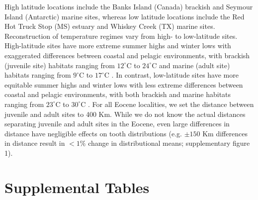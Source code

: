 \documentclass[]{rsos}%
\begin{document}
High latitude locations include the Banks Island (Canada) brackish and Seymour Island (Antarctic) marine sites, whereas low latitude locations include the Red Hot Truck Stop (MS) estuary and Whiskey Creek (TX) marine sites.
Reconstruction of temperature regimes vary from high- to low-latitude sites.
High-latitude sites have more extreme summer highs and winter lows with exaggerated differences between coastal and pelagic environments, with brackish (juvenile site) habitats ranging from $12^\circ$C to $24^\circ$C \cite{sluijs2008arctic, west2020paleobotanical} and marine (adult site) habitats ranging from $9^\circ$C to $17^\circ$C \cite{zhu2020simulation, Kim2020, west2020paleobotanical, west2015arctic}.
In contrast, low-latitude sites have more equitable summer highs and winter lows with less extreme differences between coastal and pelagic environments, with both brackish and marine habitats ranging from $23^\circ$C to $30^\circ$C \cite{keating2011warm}.
For all Eocene localities, we set the distance between juvenile and adult sites to 400 Km.
While we do not know the actual distances separating juvenile and adult sites in the Eocene, even large differences in distance have negligible effects on tooth distributions (e.g. $\pm 150$ Km differences in distance result in $<1\%$ change in distributional means; supplementary figure 1).

\clearpage
\renewcommand{\tablename}{Supplementary Table}

\section{Supplemental Tables}
\end{document}
